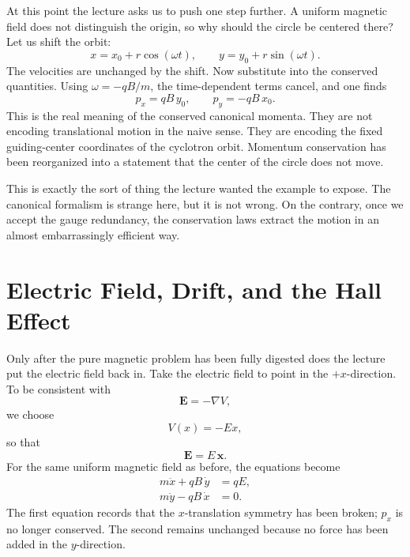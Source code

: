 At this point the lecture asks us to push one step further. A uniform magnetic field does not distinguish the origin, so why should the circle be centered there? Let us shift the orbit:
\begin{equation}
x=x_0+r\cos(\omega t),
\qquad
y=y_0+r\sin(\omega t).
\end{equation}
The velocities are unchanged by the shift. Now substitute into the conserved quantities. Using \(\omega=-qB/m\), the time-dependent terms cancel, and one finds
\begin{equation}
p_x=qB\,y_0,
\qquad
p_y=-qB\,x_0.
\end{equation}
This is the real meaning of the conserved canonical momenta. They are not encoding translational motion in the naive sense. They are encoding the fixed guiding-center coordinates of the cyclotron orbit. Momentum conservation has been reorganized into a statement that the center of the circle does not move.

This is exactly the sort of thing the lecture wanted the example to expose. The canonical formalism is strange here, but it is not wrong. On the contrary, once we accept the gauge redundancy, the conservation laws extract the motion in an almost embarrassingly efficient way.

\section{Electric Field, Drift, and the Hall Effect}

Only after the pure magnetic problem has been fully digested does the lecture put the electric field back in. Take the electric field to point in the \(+x\)-direction. To be consistent with
\begin{equation}
\mathbf E=-\nabla V,
\end{equation}
we choose
\begin{equation}
V(x)=-Ex,
\end{equation}
so that
\begin{equation}
\mathbf E=E\,\hat{\mathbf x}.
\end{equation}
For the same uniform magnetic field as before, the equations become
\begin{align}
m\ddot x+qB\,\dot y &= qE, \\
m\ddot y-qB\,\dot x &= 0.
\end{align}
The first equation records that the \(x\)-translation symmetry has been broken; \(p_x\) is no longer conserved. The second remains unchanged because no force has been added in the \(y\)-direction.

